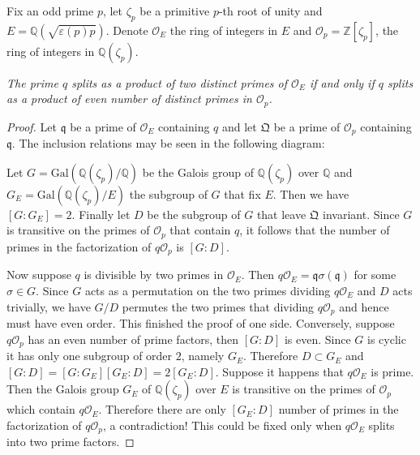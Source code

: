 Fix an odd prime $p$, let $\zeta_p$ be a primitive $p$-th root of unity and $E=\mathbb{Q}(\sqrt{\varepsilon(p)p})$. Denote $\mathcal{O}_E$ the ring of integers in $E$ and $\mathcal{O}_p=\mathbb{Z}[\zeta_p]$, the ring of integers in $\mathbb{Q}(\zeta_p)$.
\begin{lemma}\em
The prime $q$ splits as a product of two distinct primes of $\mathcal{O}_E$ if and only if $q$ splits as a product of even number of distinct primes in $\mathcal{O}_p$.
\end{lemma}
\begin{proof}
Let $\mathfrak{q}$ be a prime of $\mathcal{O}_E$ containing $q$ and let $\mathfrak{Q}$ be a prime of $\mathcal{O}_p$ containing $\mathfrak{q}$. The inclusion relations may be seen in the following diagram:
\begin{center}
\end{center}
Let $G=\mathrm{Gal}(\mathbb{Q}(\zeta_p)/\mathbb{Q})$ be the Galois group of $\mathbb{Q}(\zeta_p)$ over $\mathbb{Q}$ and $G_E=\mathrm{Gal}(\mathbb{Q}(\zeta_p)/E)$ the subgroup of $G$ that fix $E$. Then we have $[G:G_E]=2$. Finally let $D$ be the subgroup of $G$ that leave $\mathfrak{Q}$ invariant. Since $G$ is transitive on the primes of $\mathcal{O}_p$ that contain $q$, it follows that the number of primes in the factorization of $q\mathcal{O}_p$ is $[G:D]$.\par
Now suppose $q$ is divisible by two primes in $\mathcal{O}_E$. Then $q\mathcal{O}_E=\mathfrak{q}\sigma(\mathfrak{q})$ for some $\sigma\in G$. Since $G$ acts as a permutation on the two primes dividing $q\mathcal{O}_E$ and $D$ acts trivially, we have $G/D$ permutes the two primes that dividing $q\mathcal{O}_p$ and hence must have even order. This finished the proof of one side. Conversely, suppose $q\mathcal{O}_p$ has an even number of prime factors, then $[G:D]$ is even. Since $G$ is cyclic it has only one subgroup of order $2$, namely $G_E$. Therefore $D\subset G_E$ and $[G:D]=[G:G_E][G_E:D]=2[G_E:D]$. Suppose it happens that $q\mathcal{O}_E$ is prime. Then the Galois group $G_E$ of $\mathbb{Q}(\zeta_p)$ over $E$ is transitive on the primes of $\mathcal{O}_p$ which contain $q\mathcal{O}_E$. Therefore there are only $[G_E:D]$ number of primes in the factorization of $q\mathcal{O}_p$, a contradiction! This could be fixed only when $q\mathcal{O}_E$ splits into two prime factors.
\end{proof}
